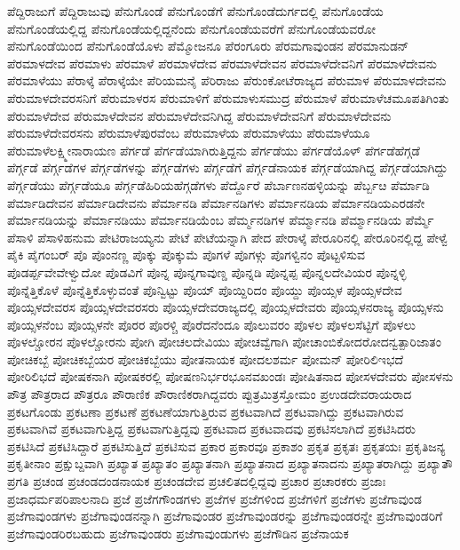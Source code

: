 {ಪೆದ್ದಿರಾಜುಗೆ
ಪೆದ್ದಿರಾಜುವು
ಪೆನುಗೊಂಡೆ
ಪೆನುಗೊಂಡೆಗೆ
ಪೆನುಗೊಂಡೆದುರ್ಗದಲ್ಲಿ
ಪೆನುಗೊಂಡೆಯ
ಪೆನುಗೊಂಡೆಯಲ್ಲಿದ್ದ
ಪೆನುಗೊಂಡೆಯಲ್ಲಿದ್ದನೆಂದು
ಪೆನುಗೊಂಡೆಯವರೆಗೆ
ಪೆನುಗೊಂಡೆಯವರೋ
ಪೆನುಗೊಂಡೆಯಿಂದ
ಪೆನುಗೊಂಡೆಯೊಳು
ಪೆಮ್ಮೋಜನೂ
ಪೆರಂಗೂರು
ಪೆರಮಗಾವುಂಡನ
ಪೆರಮಾನುಡನ್
ಪೆರಮಾಳದೇವ
ಪೆರಮಾಳು
ಪೆರಮಾಳೆ
ಪೆರಮಾಳೆದೇವ
ಪೆರಮಾಳೆದೇವನ
ಪೆರಮಾಳೆದೇವನಿಗೆ
ಪೆರಮಾಳೆದೇವನು
ಪೆರಮಾಳೆಯು
ಪೆರಾಳ್ಕೆ
ಪೆರಾಳ್ಕೆಯೇ
ಪೆರಿಯಮನೈ
ಪೆರಿರಾಜು
ಪೆರುಂಕೋಟೆರಾಜ್ಯದ
ಪೆರುಮಾಳ
ಪೆರುಮಾಳದೇವನು
ಪೆರುಮಾಳದೇವರಸನಿಗೆ
ಪೆರುಮಾಳರಸ
ಪೆರುಮಾಳಿಗೆ
ಪೆರುಮಾಳುಸಮುದ್ರ
ಪೆರುಮಾಳೆ
ಪೆರುಮಾಳೆಚಮೂಪತಿಗಿಂತು
ಪೆರುಮಾಳೆದೇವ
ಪೆರುಮಾಳೆದೇವನ
ಪೆರುಮಾಳೆದೇವನಿಗಿದ್ದ
ಪೆರುಮಾಳೆದೇವನಿಗೆ
ಪೆರುಮಾಳೆದೇವನು
ಪೆರುಮಾಳೆದೇವರಸನು
ಪೆರುಮಾಳೆಪುರವೆಂಬ
ಪೆರುಮಾಳೆಯ
ಪೆರುಮಾಳೆಯು
ಪೆರುಮಾಳೆಯೂ
ಪೆರುಮಾಳೆಲಕ್ಷ್ಮೀನಾರಾಯಣ
ಪೆರ್ಗಡೆ
ಪೆರ್ಗಡೆಯಾಗಿರುತ್ತಿದ್ದನು
ಪೆರ್ಗಡೆಯು
ಪೆರ್ಗಡೆಯೊಳ್
ಪೆರ್ಗಡೆಹೆಗ್ಗಡೆ
ಪೆರ್ಗ್ಗಡೆ
ಪೆರ್ಗ್ಗಡೆಗಳ
ಪೆರ್ಗ್ಗಡೆಗಳನ್ನು
ಪೆರ್ಗ್ಗಡೆಗಳು
ಪೆರ್ಗ್ಗಡೆಗೆ
ಪೆರ್ಗ್ಗಡೆನಾಯಕ
ಪೆರ್ಗ್ಗಡೆಯಾಗಿದ್ದ
ಪೆರ್ಗ್ಗಡೆಯಾಗಿದ್ದು
ಪೆರ್ಗ್ಗಡೆಯು
ಪೆರ್ಗ್ಗಡೆಯೂ
ಪೆರ್ಗ್ಗಡೆಹಿರಿಯಹೆಗ್ಗಡೆಗಳು
ಪೆರ್ದ್ದೊರೆ
ಪೆರ್ಬಾಣನಹಳ್ಳಿಯನ್ನು
ಪೆರ್ಬ್ಬೞ
ಪೆರ್ಮಾಡಿ
ಪೆರ್ಮಾಡಿದೇವನ
ಪೆರ್ಮಾಡಿದೇವನು
ಪೆರ್ಮಾನಡಿ
ಪೆರ್ಮಾನಡಿಗಳು
ಪೆರ್ಮಾನಡಿಯ
ಪೆರ್ಮಾನಡಿಯಎರಡನೇ
ಪೆರ್ಮಾನಡಿಯನ್ನು
ಪೆರ್ಮಾನಡಿಯು
ಪೆರ್ಮಾನಡಿಯೆಂಬ
ಪೆರ್ಮ್ಮನಡಿಗಳ
ಪೆರ್ಮ್ಮಾನಡಿ
ಪೆರ್ಮ್ಮಾನಡಿಯ
ಪೆರ್ಮ್ಮೆ
ಪೆಸಾಳಿ
ಪೆಸಾಳಿಹನುಮ
ಪೇಟಿರಾಜಯ್ಯನು
ಪೇಟೆ
ಪೇಟೆಯನ್ನಾಗಿ
ಪೇದ
ಪೇರಾಳ್ಕೆ
ಪೇರೂರಿನಲ್ಲಿ
ಪೇರೂರಿನಲ್ಲಿದ್ದ
ಪೇಳ್ವೆ
ಪೈಕಿ
ಪೈಗಂಬರ್
ಪೊ
ಪೊಂನಣ್ಣ
ಪೊಕ್ಕು
ಪೊಕ್ಕುಮೆ
ಪೊಗಳೆ
ಪೊಗಳ್ಗು
ಪೊಗಳ್ವಿನಂ
ಪೊಟ್ಟಳಿಸುವ
ಪೊಡರ್ಪ್ಪವೇವೇಳ್ವುದೋ
ಪೊಡವಿಗೆ
ಪೊನ್ನ
ಪೊನ್ನಗಾವುಣ್ಡ
ಪೊನ್ನಡಿ
ಪೊನ್ನಪ್ಪ
ಪೊನ್ನಲದೇವಿಯರ
ಪೊನ್ನಳ್ಳಿ
ಪೊನ್ನೆತ್ತಿಕೊಳೆ
ಪೊನ್ನೆತ್ತಿಕೊಳ್ಳುವಂತೆ
ಪೊನ್ವಿಟ್ಟು
ಪೊಯ್
ಪೊಯ್ದಿರಿದಂ
ಪೊಯ್ದು
ಪೊಯ್ಸಳ
ಪೊಯ್ಸಳದೇವ
ಪೊಯ್ಸಳದೇವರಸ
ಪೊಯ್ಸಳದೇವರಸರು
ಪೊಯ್ಸಳದೇವರಾಜ್ಯದಲ್ಲಿ
ಪೊಯ್ಸಳದೇವರು
ಪೊಯ್ಸಳನರಾಜ್ಯ
ಪೊಯ್ಸಳನು
ಪೊಯ್ಸಳನೆಂಬ
ಪೊಯ್ಸಳನೇ
ಪೊರರ
ಪೊರಳ್ಚಿ
ಪೊರೆದನೆಂದೂ
ಪೊಲುವರಂ
ಪೊಳಲ
ಪೊಳಲಸೆಟ್ಟಿಗೆ
ಪೊಳಲು
ಪೊಳಲ್ಚೋರನ
ಪೊಳಲ್ಚೋರನು
ಪೋಗಿ
ಪೋಚಲದೇವಿಯು
ಪೋಚವ್ವೆಗಾಗಿ
ಪೋಚಾಂಬಿಕೋದರೋದನ್ವತ್ಪಾರಿಜಾತಂ
ಪೋಚಿಕಬ್ಬೆ
ಪೋಚಿಕಬ್ಬೆಯರ
ಪೋಚಿಕಬ್ಬೆಯು
ಪೋತನಾಯಕ
ಪೋದಲಶರ್ಮ
ಪೋಮನ್
ಪೋರಿಲಿಇಭದೆ
ಪೋರಿಲಿಭದೆ
ಪೋಷಕನಾಗಿ
ಪೋಷಕರಲ್ಲಿ
ಪೋಷಣನಿರ್ಭರಭೂನವಖಂಡಃ
ಪೋಷಿತನಾದ
ಪೋಸಳದೇವರು
ಪೋಸಳನು
ಪೌತ್ರ
ಪೌತ್ರರಾದ
ಪೌತ್ರರೂ
ಪೌರಾಣಿಕ
ಪೌರಾಣಿಕರಾಗಿದ್ದವರು
ಪ್ಪುತ್ರಮಿತ್ರಸ್ತೋಮಂ
ಪ್ರಉಡದೇವರಾಯರಾದ
ಪ್ರಕಟಗೊಂಡು
ಪ್ರಕಟಣಾ
ಪ್ರಕಟಣೆ
ಪ್ರಕಟಣೆಯಾಗುತ್ತಿರುವ
ಪ್ರಕಟವಾಗಿದೆ
ಪ್ರಕಟವಾಗಿದ್ದು
ಪ್ರಕಟವಾಗಿರುವ
ಪ್ರಕಟವಾಗಿವೆ
ಪ್ರಕಟವಾಗುತ್ತಿದ್ದ
ಪ್ರಕಟವಾಗುತ್ತಿದ್ದವು
ಪ್ರಕಟವಾದ
ಪ್ರಕಟವಾದವು
ಪ್ರಕಟಿಸಲಾಗಿದೆ
ಪ್ರಕಟಿಸಿದರು
ಪ್ರಕಟಿಸಿದೆ
ಪ್ರಕಟಿಸಿದ್ದಾರೆ
ಪ್ರಕಟಿಸುತ್ತಿದೆ
ಪ್ರಕಟಿಸುವ
ಪ್ರಕಾರ
ಪ್ರಕಾರವೂ
ಪ್ರಕಾಶಂ
ಪ್ರಕೃತ
ಪ್ರಕೃತಃ
ಪ್ರಕೃತಯಃ
ಪ್ರಕೃತಿಜನ್ಯ
ಪ್ರಕೃತೀನಾಂ
ಪ್ರಕ್ಷುಬ್ದವಾಗಿ
ಪ್ರಖ್ಯಾತ
ಪ್ರಖ್ಯಾತಂ
ಪ್ರಖ್ಯಾತನಾಗಿ
ಪ್ರಖ್ಯಾತನಾದ
ಪ್ರಖ್ಯಾತನಾದನು
ಪ್ರಖ್ಯಾತರಾಗಿದ್ದು
ಪ್ರಖ್ಯಾತೌ
ಪ್ರಗತಿ
ಪ್ರಚಂಡ
ಪ್ರಚಂಡದಂಡನಾಯಕ
ಪ್ರಚಂಡದೇವ
ಪ್ರಚಲಿತದಲ್ಲಿದ್ದವು
ಪ್ರಚಾರ
ಪ್ರಚಾರಕರು
ಪ್ರಜಾಃ
ಪ್ರಜಾಧರ್ಮಪರಿಪಾಲನಾದಿ
ಪ್ರಜೆ
ಪ್ರಜೆಗಗೌಂಡಗಳು
ಪ್ರಜೆಗಳ
ಪ್ರಜೆಗಳಿಂದ
ಪ್ರಜೆಗಳಿಗೆ
ಪ್ರಜೆಗಳು
ಪ್ರಜೆಗಾವುಂಡ
ಪ್ರಜೆಗಾವುಂಡಗಳು
ಪ್ರಜೆಗಾವುಂಡನನ್ನಾಗಿ
ಪ್ರಜೆಗಾವುಂಡರ
ಪ್ರಜೆಗಾವುಂಡರನ್ನು
ಪ್ರಜೆಗಾವುಂಡರನ್ನೇ
ಪ್ರಜೆಗಾವುಂಡರಿಗೆ
ಪ್ರಜೆಗಾವುಂಡರಿರಬಹುದು
ಪ್ರಜೆಗಾವುಂಡರು
ಪ್ರಜೆಗಾವುಂಡುಗಳು
ಪ್ರಜೆಗೌಡಿನ
ಪ್ರಜೆನಾಯಕ
}
